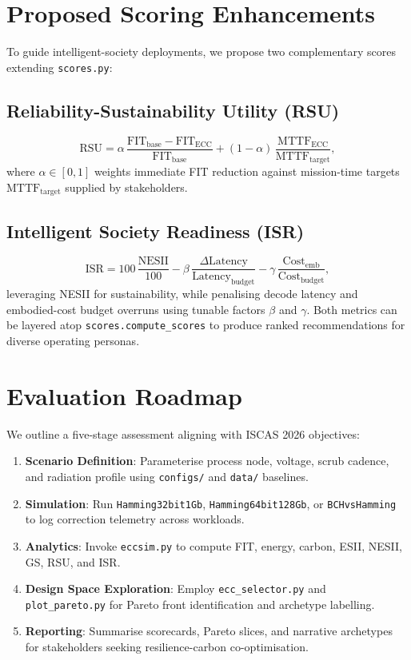 \documentclass[conference]{IEEEtran}
\begin{document}
\section{Proposed Scoring Enhancements}
To guide intelligent-society deployments, we propose two complementary scores extending \texttt{scores.py}:
\subsection{Reliability-Sustainability Utility (RSU)}
\begin{equation}
    \text{RSU} = \alpha\,\frac{\text{FIT}_{\text{base}}-\text{FIT}_{\text{ECC}}}{\text{FIT}_{\text{base}}} + (1-\alpha)\,\frac{\text{MTTF}_{\text{ECC}}}{\text{MTTF}_{\text{target}}},
\end{equation}
where $\alpha\in[0,1]$ weights immediate FIT reduction against mission-time targets $\text{MTTF}_{\text{target}}$ supplied by stakeholders.
\subsection{Intelligent Society Readiness (ISR)}
\begin{equation}
    \text{ISR} = 100\,\frac{\text{NESII}}{100} - \beta\,\frac{\Delta \text{Latency}}{\text{Latency}_{\text{budget}}} - \gamma\,\frac{\text{Cost}_{\text{emb}}}{\text{Cost}_{\text{budget}}},
\end{equation}
leveraging NESII for sustainability, while penalising decode latency and embodied-cost budget overruns using tunable factors $\beta$ and $\gamma$.
Both metrics can be layered atop \texttt{scores.compute\_scores} to produce ranked recommendations for diverse operating personas.
\section{Evaluation Roadmap}
We outline a five-stage assessment aligning with ISCAS 2026 objectives:
\begin{enumerate}
    \item \textbf{Scenario Definition}: Parameterise process node, voltage, scrub cadence, and radiation profile using \texttt{configs/} and \texttt{data/} baselines.
    \item \textbf{Simulation}: Run \texttt{Hamming32bit1Gb}, \texttt{Hamming64bit128Gb}, or \texttt{BCHvsHamming} to log correction telemetry across workloads.
    \item \textbf{Analytics}: Invoke \texttt{eccsim.py} to compute FIT, energy, carbon, ESII, NESII, GS, RSU, and ISR.
    \item \textbf{Design Space Exploration}: Employ \texttt{ecc\_selector.py} and \texttt{plot\_pareto.py} for Pareto front identification and archetype labelling.
    \item \textbf{Reporting}: Summarise scorecards, Pareto slices, and narrative archetypes for stakeholders seeking resilience-carbon co-optimisation.
\end{enumerate}
\end{document}
